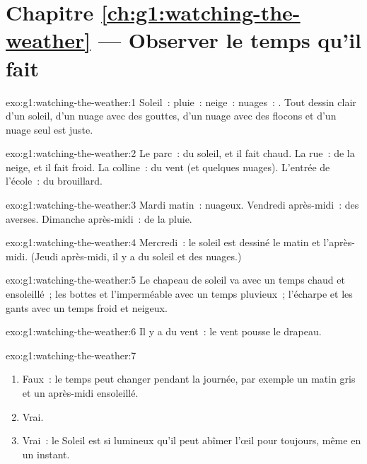 \section*{Chapitre \ref{ch:g1:watching-the-weather} --- Observer le temps qu'il fait}

\begin{solution}{exo:g1:watching-the-weather:1}
Soleil~: \quad pluie~: \quad neige~: \quad
nuages~: . Tout dessin clair d'un soleil, d'un nuage avec des
gouttes, d'un nuage avec des flocons et d'un nuage seul est juste.
\end{solution}

\begin{solution}{exo:g1:watching-the-weather:2}
Le parc~: du soleil, et il fait chaud. La rue~: de la neige, et il fait
froid. La colline~: du vent (et quelques nuages). L'entrée de l'école~: du
brouillard.
\end{solution}

\begin{solution}{exo:g1:watching-the-weather:3}
Mardi matin~: nuageux. Vendredi après-midi~: des averses. Dimanche
après-midi~: de la pluie.
\end{solution}

\begin{solution}{exo:g1:watching-the-weather:4}
Mercredi~: le soleil est dessiné le matin et l'après-midi.
(Jeudi après-midi, il y a du soleil et des nuages.)
\end{solution}

\begin{solution}{exo:g1:watching-the-weather:5}
Le chapeau de soleil va avec un temps chaud et ensoleillé~; les bottes et
l'imperméable avec un temps pluvieux~; l'écharpe et les gants avec un temps
froid et neigeux.
\end{solution}

\begin{solution}{exo:g1:watching-the-weather:6}
Il y a du vent~: le vent pousse le drapeau.
\end{solution}

\begin{solution}{exo:g1:watching-the-weather:7}
\begin{enumerate}
  \item Faux~: le temps peut changer pendant la journée, par exemple un
        matin gris et un après-midi ensoleillé.
  \item Vrai.
  \item Vrai~: le Soleil est si lumineux qu'il peut abîmer l'œil pour
        toujours, même en un instant.
\end{enumerate}
\end{solution}

